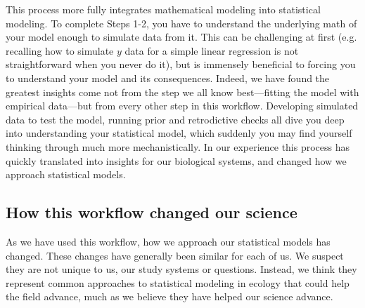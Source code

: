 \documentclass[11pt]{article}
\begin{document}
This process more fully integrates mathematical modeling into statistical modeling. To complete Steps 1-2, you have to understand the underlying math of your model enough to simulate data from it. This can be challenging at first (e.g. recalling how to simulate $y$ data for a simple linear regression is not straightforward when you never do it), but is immensely beneficial to forcing you to understand your model and its consequences. Indeed, we have found the greatest insights come not from the step we all know best---fitting the model with empirical data---but from every other step in this workflow. Developing simulated data to test the model, running prior and retrodictive checks all dive you deep into understanding your statistical model, which suddenly you may find yourself thinking through much more mechanistically. In our experience this process has quickly translated into insights for our biological systems, and changed how we approach statistical models. %


\subsection*{How this workflow changed our science} %

As we have used this workflow, how we approach our statistical models has changed. These changes have generally been similar for each of us. We suspect they are not unique to us, our study systems or questions. Instead, we think they represent common approaches to statistical modeling in ecology that could help the field advance, much as we believe they have helped our science advance. 
\end{document}
